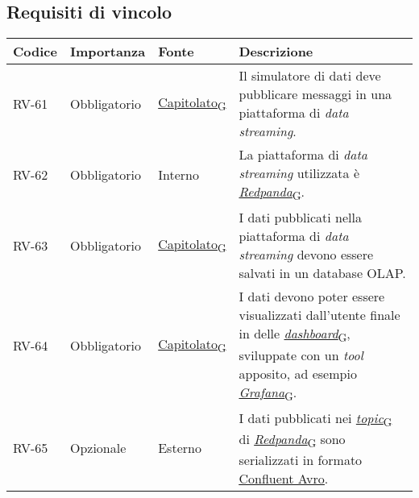 \subsection{Requisiti di vincolo}
\begin{longtable}{|>{\centering\arraybackslash}m{}|>{\centering\arraybackslash}m{}|>{\centering\arraybackslash}m{}|>{\centering\arraybackslash}m{}|}
	\hline
	\textbf{Codice} & \textbf{Importanza} & \textbf{Fonte}                                                                                                    & \textbf{Descrizione}
	\\\hline
	\endfirsthead
	\hline
	\endhead
	RV-61           & Obbligatorio        & \href{https://7last.github.io/docs/pb/documentazione-interna/glossario\#capitolato}{Capitolato\textsubscript{G}} & Il simulatore di dati deve pubblicare messaggi in una piattaforma di \textit{data streaming}.
	\\\hline
	RV-62           & Obbligatorio        & Interno                                                                                                           & La piattaforma di \textit{data streaming} utilizzata è \href{https://7last.github.io/docs/pb/documentazione-interna/glossario\#redpanda}{\textit{Redpanda}\textsubscript{G}}.
	\\\hline
	RV-63           & Obbligatorio        & \href{https://7last.github.io/docs/pb/documentazione-interna/glossario\#capitolato}{Capitolato\textsubscript{G}} & I dati pubblicati nella piattaforma di \textit{data streaming} devono essere salvati in un database OLAP.
	\\\hline
	RV-64           & Obbligatorio        & \href{https://7last.github.io/docs/pb/documentazione-interna/glossario\#capitolato}{Capitolato\textsubscript{G}} & I dati devono poter essere visualizzati dall'utente finale in delle \href{https://7last.github.io/docs/pb/documentazione-interna/glossario\#dashboard}{\textit{dashboard}\textsubscript{G}}, sviluppate con un \textit{tool} apposito, ad esempio \href{https://7last.github.io/docs/pb/documentazione-interna/glossario\#grafana}{\textit{Grafana}\textsubscript{G}}.
	\\\hline
	RV-65           & Opzionale           & Esterno                                                                                                           & I dati pubblicati nei \href{https://7last.github.io/docs/pb/documentazione-interna/glossario\#topic}{\textit{topic}\textsubscript{G}} di \href{https://7last.github.io/docs/pb/documentazione-interna/glossario\#redpanda}{\textit{Redpanda}\textsubscript{G}} sono serializzati in formato \href{https://docs.confluent.io/platform/current/schema-registry/fundamentals/serdes-develop/serdes-avro.html}{\underline{Confluent Avro}}.

\end{longtable}
